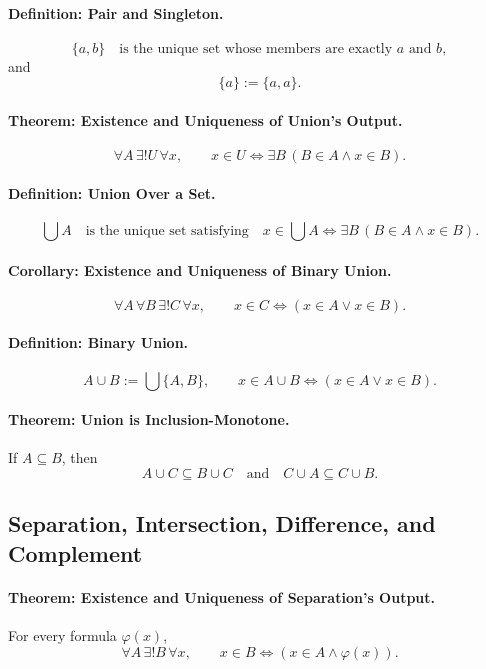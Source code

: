 \paragraph{Definition: Pair and Singleton.}
\[
  \{a,b\}
  \quad\text{is the unique set whose members are exactly }a\text{ and }b,
\]
and
\[
  \{a\}:=\{a,a\}.
\]

\paragraph{Theorem: Existence and Uniqueness of Union's Output.}
\[
  \forall A\,\exists!U\,\forall x,\qquad
  x\in U\Longleftrightarrow \exists B\,(B\in A\land x\in B).
\]

\paragraph{Definition: Union Over a Set.}
\[
  \bigcup A
  \quad\text{is the unique set satisfying}\quad
  x\in\bigcup A
  \Longleftrightarrow
  \exists B\,(B\in A\land x\in B).
\]

\paragraph{Corollary: Existence and Uniqueness of Binary Union.}
\[
  \forall A\,\forall B\,\exists!C\,\forall x,\qquad
  x\in C\Longleftrightarrow (x\in A\lor x\in B).
\]

\paragraph{Definition: Binary Union.}
\[
  A\cup B:=\bigcup\{A,B\},
  \qquad
  x\in A\cup B
  \Longleftrightarrow
  (x\in A\lor x\in B).
\]

\paragraph{Theorem: Union is Inclusion-Monotone.}
If \(A\subseteq B\), then
\[
  A\cup C\subseteq B\cup C
  \quad\text{and}\quad
  C\cup A\subseteq C\cup B.
\]

\subsection*{Separation, Intersection, Difference, and Complement}

\paragraph{Theorem: Existence and Uniqueness of Separation's Output.}
For every formula \(\varphi(x)\),
\[
  \forall A\,\exists!B\,\forall x,\qquad
  x\in B\Longleftrightarrow (x\in A\land\varphi(x)).
\]

